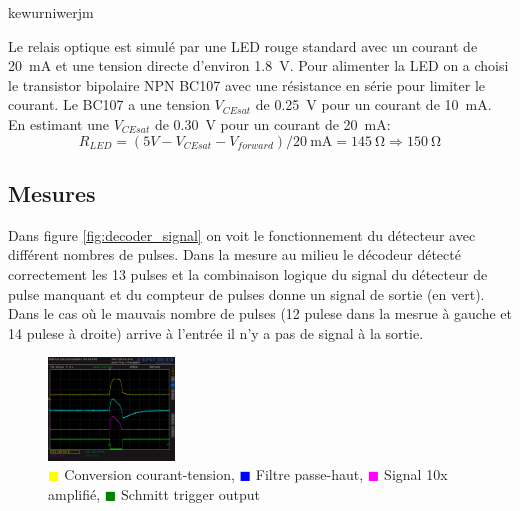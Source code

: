 \documentclass[french]{layout/Report}
\begin{document}
\begin{description}[leftmargin=!,labelwidth=4cm, labelindent=\parindent]
	\item[Déclencheur] kewurniwerjm
	\item[Relais] Le relais optique est simulé par une LED rouge standard avec un courant de \SI{20}{\milli\ampere} et une tension directe d'environ \SI{1.8}{\volt}. Pour alimenter la LED on a choisi le transistor bipolaire NPN BC107 avec une résistance en série pour limiter le courant.
		Le BC107 a une tension \(V_{CEsat}\) de \SI{0.25}{\volt} pour un courant de \SI{10}{\milli\ampere}.
		En estimant une \(V_{CEsat}\) de \SI{0.30}{\volt} pour un courant de \SI{20}{\milli\ampere}:
\begin{equation*}
R_{LED} = (5V - V_{CEsat} - V_{forward})/\SI{20}{\milli\ampere} = \SI{145}{\ohm} \Rightarrow \SI{150}{\ohm}
\end{equation*}


\end{description}
\subsection{Mesures}

Dans figure \ref{fig:decoder_signal} on voit le fonctionnement du détecteur avec différent nombres de pulses.
Dans la mesure au milieu le décodeur détecté correctement les 13 pulses et la combinaison logique
du signal du détecteur de pulse manquant et du compteur de pulses donne un signal de sortie (en vert).
Dans le cas où le mauvais nombre  de pulses (12 pulese dans la mesrue à gauche et 14 pulese à droite)
arrive à l'entrée il n'y a pas de signal à la sortie.

\begin{figure}[h]
\hspace{5mm}
\includegraphics[width=0.3\textwidth]{../measurements/SCR03}
\caption{
\textcolor{yellow}{$\blacksquare$} Conversion courant-tension,
\textcolor{blue}{$\blacksquare$} Filtre passe-haut,
\textcolor{magenta}{$\blacksquare$} Signal 10x amplifié,
\textcolor{green}{$\blacksquare$} Schmitt trigger output
}
\label{fig:filter_signal}
\end{figure}
\end{document}
